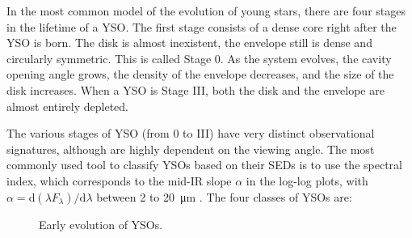 In the most common model of the evolution of young stars, there are four stages in the lifetime of a YSO. The first stage consists of a dense core right after the YSO is born. The disk is almost inexistent, the envelope still is dense and circularly symmetric. This is called Stage 0. As the system evolves, the cavity opening angle grows, the density of the envelope decreases, and the size of the disk increases. When a YSO is Stage III, both the disk and the envelope are almost entirely depleted.

The various stages of YSO (from 0 to III) have very distinct observational signatures, although are highly dependent on the viewing angle. The most commonly used tool to classify YSOs based on their SEDs is to use the spectral index, which corresponds to the mid-IR slope $\alpha$ in the log-log plots, with $\alpha = \textrm{d}(\lambda F_\lambda)/\textrm{d}\lambda$ between 2 to \SI{20}{\micro\meter} \citep{McKee:2007bd}. The four classes of YSOs are:


\begin{figure}[!h]
\begin{center}
 \par\medskip
{} 
\caption[Early evolution of YSOs]{Early evolution of YSOs.}
\label{fig:EarlyStages}
\end{center}
\end{figure}

